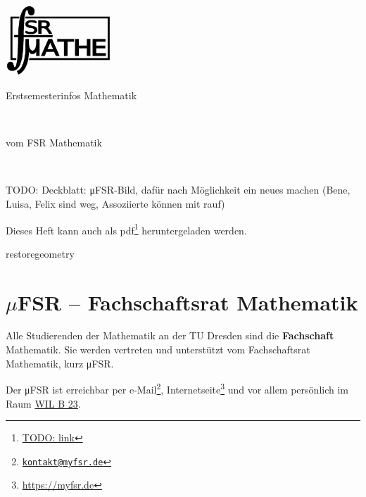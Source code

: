 \documentclass{scrartcl}
\begin{document}
\newcommand{\keyword}{\textbf}
\newcommand{\todo}[1]{\marginpar{TODO\\#1}}
\newpage
{ 
  \thispagestyle{empty} %
  \begin{flushright}
    \includegraphics[width=0.3\textwidth]{./fsrlogos/bw_1024.png}
  \end{flushright}
  \begin{center}
    \begin{huge}
      Erstsemesterinfos Mathematik
    \end{huge}\\\bigskip
    \begin{Large}
      vom FSR Mathematik
    \end{Large}\\\bigskip
  \end{center}
  TODO: Deckblatt: μFSR-Bild, dafür nach Möglichkeit ein neues machen (Bene, Luisa, Felix sind weg, Assoziierte können mit rauf) 
  \vfill
  \begin{small}
    Dieses Heft kann auch als pdf\footnote{\url{TODO: link}} heruntergeladen werden.
  \end{small}
  \newpage
}
restoregeometry %
\pagestyle{plain}
\section*{\texorpdfstring{$\mu$}{my}FSR -- Fachschaftsrat Mathematik}
Alle Studierenden der Mathematik an der TU Dresden sind die \keyword{Fachschaft} Mathematik.
Sie werden vertreten und unterstützt vom Fachschaftsrat Mathematik, kurz μFSR.

Der μFSR ist erreichbar per e-Mail\footnote{\href{mailto:kontakt@myfsr.de}{\nolinkurl{kontakt@myfsr.de}}},
Internetseite\footnote{\url{https://myfsr.de}} und vor allem persönlich im Raum
\href{https://navigator.tu-dresden.de/etplan/wil/-1/raum/2193-1.0170}{WIL B 23}.
\end{document}
